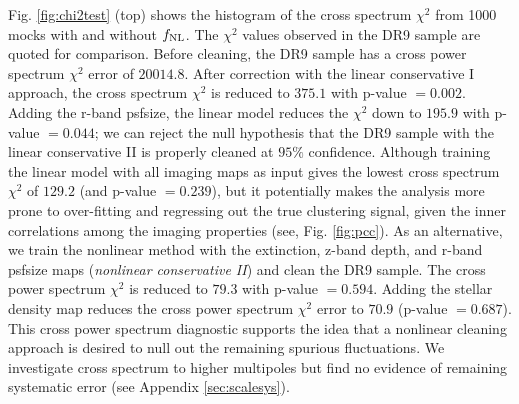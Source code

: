Fig. \ref{fig:chi2test} (top) shows the histogram of the cross spectrum $\chi^{2}$ from 1000 mocks with and without $f_{\rm NL}$. The $\chi^{2}$ values observed in the DR9 sample are quoted for comparison. Before cleaning, the DR9 sample has a cross power spectrum $\chi^{2}$ error of $20014.8$. After correction with the linear conservative I approach, the cross spectrum $\chi^{2}$ is reduced to $375.1$ with p-value $=0.002$. Adding the r-band psfsize, the linear model reduces the $\chi^{2}$ down to $195.9$ with p-value $=0.044$; we can reject the null hypothesis that the DR9 sample with the linear conservative II is properly cleaned at $95\%$ confidence. Although training the linear model with all imaging maps as input gives the lowest cross spectrum $\chi^{2}$ of $129.2$ (and p-value $=0.239$), but it potentially makes the analysis more prone to over-fitting and regressing out the true clustering signal, given the inner correlations among the imaging properties (see, Fig. \ref{fig:pcc}). As an alternative, we train the nonlinear method with the extinction, z-band depth, and r-band psfsize maps (\textit{nonlinear conservative II}) and clean the DR9 sample. The cross power spectrum $\chi^{2}$ is reduced to $79.3$ with p-value $=0.594$.  Adding the stellar density map reduces the cross power spectrum $\chi^{2}$ error to $70.9$ (p-value $=0.687$). This cross power spectrum diagnostic supports the idea that a nonlinear cleaning approach is desired to null out the remaining spurious fluctuations. We investigate cross spectrum to higher multipoles but find no evidence of remaining systematic error (see Appendix \ref{sec:scalesys}). 

